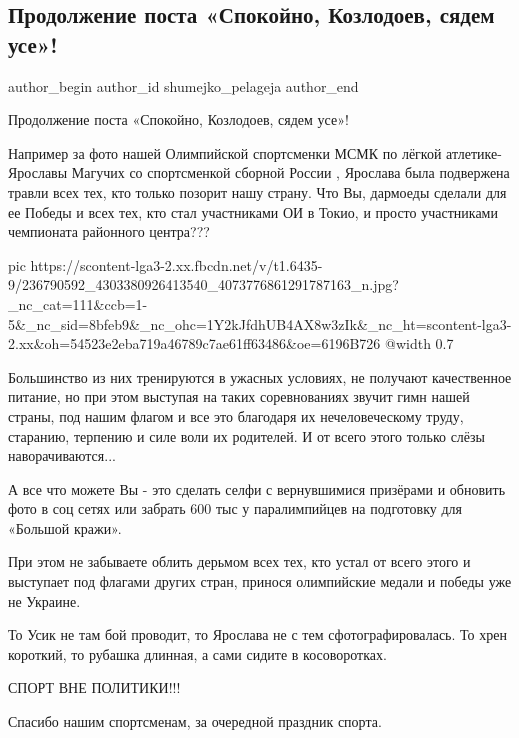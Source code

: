  
 
 
 
 
 
\subsection{Продолжение поста «Спокойно, Козлодоев, сядем усе»!}
\label{sec:12_08_2021.fb.shumejko_pelageja.1.olimpiada_travlja_sport}
 
\ifcmt
 author_begin
   author_id shumejko_pelageja
 author_end
\fi

Продолжение поста «Спокойно, Козлодоев, сядем усе»!

Например за фото нашей Олимпийской спортсменки МСМК по лёгкой атлетике-
Ярославы Магучих  со спортсменкой сборной России , Ярослава была подвержена
травли всех тех, кто только позорит нашу страну. Что Вы, дармоеды сделали для
ее Победы и всех тех, кто стал участниками ОИ в Токио, и просто участниками
чемпионата районного центра???

\ifcmt
  pic https://scontent-lga3-2.xx.fbcdn.net/v/t1.6435-9/236790592_4303380926413540_4073776861291787163_n.jpg?_nc_cat=111&ccb=1-5&_nc_sid=8bfeb9&_nc_ohc=1Y2kJfdhUB4AX8w3zIk&_nc_ht=scontent-lga3-2.xx&oh=54523e2eba719a46789c7ae61ff63486&oe=6196B726
  @width 0.7
\fi

Большинство из них тренируются в ужасных условиях, не получают качественное
питание, но при этом выступая на таких соревнованиях звучит гимн нашей страны,
под нашим флагом и все это благодаря их нечеловеческому труду, старанию,
терпению и силе воли их родителей. И от всего этого только слёзы
наворачиваются...

А все что можете Вы  - это сделать селфи с вернувшимися призёрами и обновить
фото в соц сетях или забрать 600 тыс у паралимпийцев на подготовку для «Большой
кражи».

При этом не забываете облить дерьмом всех тех, кто устал от всего этого и
выступает под флагами других стран, принося олимпийские медали и победы уже не
Украине.

То Усик не там бой проводит, то Ярослава не с тем сфотографировалась. То хрен
короткий, то рубашка длинная, а сами сидите в косоворотках.

СПОРТ ВНЕ ПОЛИТИКИ!!!

Спасибо нашим спортсменам, за очередной праздник спорта.
